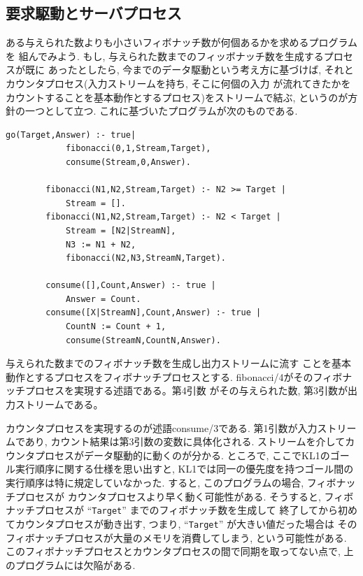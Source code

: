 \documentclass[a4,titlepage]{jsreport}
\newenvironment{program}{\begin{quote}}{\end{quote}}
\begin{document}
\subsection{要求駆動とサーバプロセス}
ある与えられた数よりも小さいフィボナッチ数が何個あるかを求めるプログラムを
組んでみよう.  
もし, 与えられた数までのフィッボナッチ数を生成するプロセスが既に
あったとしたら, 
今までのデータ駆動という考え方に基づけば, 
それとカウンタプロセス(入力ストリームを持ち, そこに何個の入力
が流れてきたかをカウントすることを基本動作とするプロセス)をストリームで結ぶ, 
というのが方針の一つとして立つ.  
これに基づいたプログラムが次のものである.  

\begin{Verbatim}[baselinestretch=0.8]
        go(Target,Answer) :- true|
            fibonacci(0,1,Stream,Target),
            consume(Stream,0,Answer).
        
        fibonacci(N1,N2,Stream,Target) :- N2 >= Target |
            Stream = [].
        fibonacci(N1,N2,Stream,Target) :- N2 < Target |
            Stream = [N2|StreamN],
            N3 := N1 + N2,
            fibonacci(N2,N3,StreamN,Target).
        
        consume([],Count,Answer) :- true |
            Answer = Count.
        consume([X|StreamN],Count,Answer) :- true |
            CountN := Count + 1,
            consume(StreamN,CountN,Answer).
\end{Verbatim}
与えられた数までのフィボナッチ数を生成し出力ストリームに流す
ことを基本動作とするプロセスをフィボナッチプロセスとする.   
fibonacci/4がそのフィボナッチプロセスを実現する述語である。第4引数
がその与えられた数, 第3引数が出力ストリームである。

カウンタプロセスを実現するのが述語consume/3である.   
第1引数が入力ストリームであり, カウント結果は第3引数の変数に具体化される.  
ストリームを介してカウンタプロセスがデータ駆動的に動くのが分かる.  
ところで, ここでKL1のゴール実行順序に関する仕様を思い出すと, 
KL1では同一の優先度を持つゴール間の実行順序は特に規定していなかった.  
すると, このプログラムの場合, フィボナッチプロセスが
カウンタプロセスより早く動く可能性がある.  そうすると, 
フィボナッチプロセスが ``\verb!Target!'' までのフィボナッチ数を生成して
終了してから初めてカウンタプロセスが動き出す, つまり, 
 ``\verb!Target!'' が大きい値だった場合は
そのフィボナッチプロセスが大量のメモリを消費してしまう, という可能性がある.  
このフィボナッチプロセスとカウンタプロセスの間で同期を取ってない点で, 
上のプログラムには欠陥がある.  
\end{document}
